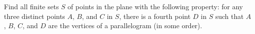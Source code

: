 Find all finite sets $S$ of points in the plane with the following property: for any three distinct points $A$, $B$, and $C$ in $S$, there is a fourth point $D$ in $S$ such that  $A$, $B$, $C$, and $D$ are the vertices of a parallelogram (in some order).